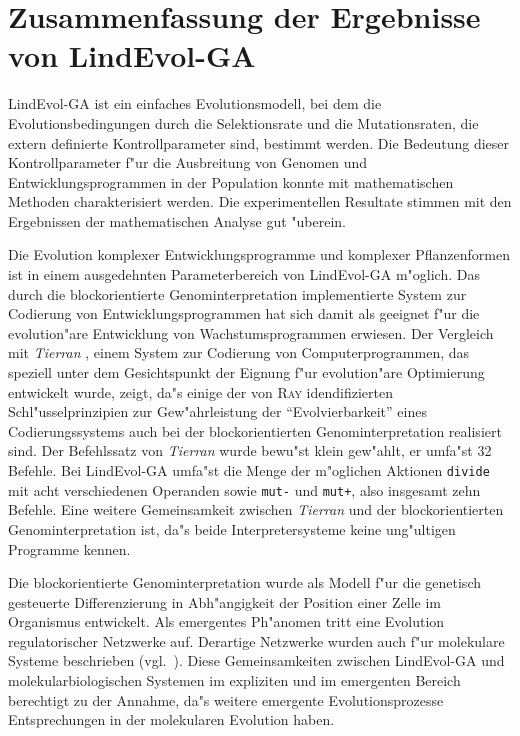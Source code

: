 

\section{Zusammenfassung der Ergebnisse von LindEvol-GA}

LindEvol-GA ist ein einfaches Evolutionsmodell, bei dem die Evolutionsbedingungen durch die Selektionsrate und die Mutationsraten,
die extern definierte Kontrollparameter sind, bestimmt werden. Die Bedeutung dieser Kontrollparameter f"ur die Ausbreitung
von Genomen und Entwicklungsprogrammen in der Population konnte mit mathematischen Methoden charakterisiert werden. Die
experimentellen Resultate stimmen mit den Ergebnissen der mathematischen Analyse gut "uberein. 

Die Evolution komplexer Entwicklungsprogramme und komplexer Pflanzenformen ist in einem ausgedehnten Parameterbereich von
LindEvol-GA m"oglich. Das durch die blockorientierte Genominterpretation implementierte System zur Codierung von Entwicklungsprogrammen
hat sich damit als geeignet f"ur die evolution"are Entwicklung von Wachstumsprogrammen erwiesen. Der Vergleich mit
\textsl{Tierran} \cite{Ray92}, einem System zur Codierung von Computerprogrammen, das speziell unter dem Gesichtspunkt
der Eignung f"ur evolution"are Optimierung entwickelt wurde, zeigt, da"s einige der von \textsc{Ray} idendifizierten Schl"usselprinzipien
zur Gew"ahrleistung der "`Evolvierbarkeit"' eines Codierungssystems auch bei der blockorientierten Genominterpretation
realisiert sind. Der Befehlssatz von \textsl{Tierran} wurde bewu"st klein gew"ahlt, er umfa"st 32 Befehle. Bei LindEvol-GA
umfa"st die Menge der m"oglichen Aktionen \verb|divide| mit acht verschiedenen Operanden sowie \verb|mut-| und \verb|mut+|,
also insgesamt zehn Befehle. Eine weitere Gemeinsamkeit zwischen \textsl{Tierran} und der blockorientierten Genominterpretation
ist, da"s beide Interpretersysteme keine ung"ultigen Programme kennen.

Die blockorientierte Genominterpretation wurde als Modell f"ur die genetisch gesteuerte Differenzierung in Abh"angigkeit
der Position einer Zelle im Organismus entwickelt. Als emergentes Ph"anomen tritt eine Evolution regulatorischer Netzwerke
auf. Derartige Netzwerke wurden auch f"ur molekulare Systeme beschrieben (vgl.\ \cite{Theissen95}). Diese Gemeinsamkeiten
zwischen LindEvol-GA und molekularbiologischen Systemen im expliziten und im emergenten Bereich berechtigt zu der Annahme,
da"s weitere emergente Evolutionsprozesse Entsprechungen in der molekularen Evolution haben.

